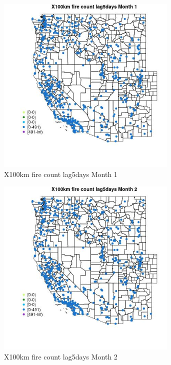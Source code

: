 \begin{figure} 
\centering  
\includegraphics[width=0.77\textwidth]{Code_Outputs/Report_ML_input_PM25_Step4_part_e_de_duplicated_aves_compiled_2019-05-14wNAs_MapObsMo1X100km_fire_count_lag5days.jpg} 
\caption{\label{fig:Report_ML_input_PM25_Step4_part_e_de_duplicated_aves_compiled_2019-05-14wNAsMapObsMo1X100km_fire_count_lag5days}X100km fire count lag5days Month 1} 
\end{figure} 
 

\clearpage 

\begin{figure} 
\centering  
\includegraphics[width=0.77\textwidth]{Code_Outputs/Report_ML_input_PM25_Step4_part_e_de_duplicated_aves_compiled_2019-05-14wNAs_MapObsMo2X100km_fire_count_lag5days.jpg} 
\caption{\label{fig:Report_ML_input_PM25_Step4_part_e_de_duplicated_aves_compiled_2019-05-14wNAsMapObsMo2X100km_fire_count_lag5days}X100km fire count lag5days Month 2} 
\end{figure} 
 

